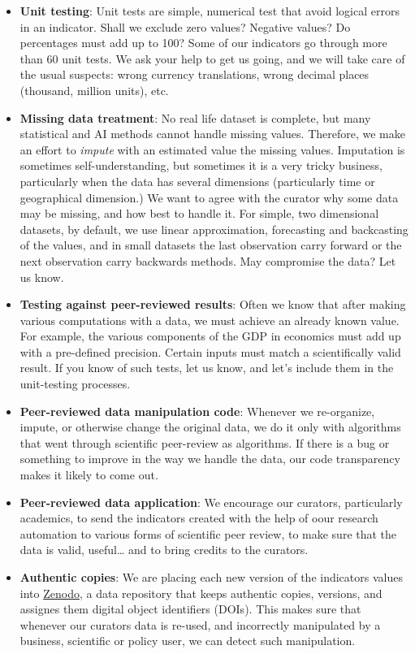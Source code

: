 \documentclass[
  a4paper,
  openany, a4paper, oneside]{book}
\begin{document}
\begin{itemize}
\item
  \textbf{Unit testing}: Unit tests are simple, numerical test that avoid logical errors in an indicator. Shall we exclude zero values? Negative values? Do percentages must add up to 100? Some of our indicators go through more than 60 unit tests. We ask your help to get us going, and we will take care of the usual suspects: wrong currency translations, wrong decimal places (thousand, million units), etc.
\item
  \textbf{Missing data treatment}: No real life dataset is complete, but many statistical and AI methods cannot handle missing values. Therefore, we make an effort to \emph{impute} with an estimated value the missing values. Imputation is sometimes self-understanding, but sometimes it is a very tricky business, particularly when the data has several dimensions (particularly time or geographical dimension.) We want to agree with the curator why some data may be missing, and how best to handle it. For simple, two dimensional datasets, by default, we use linear approximation, forecasting and backcasting of the values, and in small datasets the last observation carry forward or the next observation carry backwards methods. May compromise the data? Let us know.
\item
  \textbf{Testing against peer-reviewed results}: Often we know that after making various computations with a data, we must achieve an already known value. For example, the various components of the GDP in economics must add up with a pre-defined precision. Certain inputs must match a scientifically valid result. If you know of such tests, let us know, and let's include them in the unit-testing processes.
\item
  \textbf{Peer-reviewed data manipulation code}: Whenever we re-organize, impute, or otherwise change the original data, we do it only with algorithms that went through scientific peer-review as algorithms. If there is a bug or something to improve in the way we handle the data, our code transparency makes it likely to come out.
\item
  \textbf{Peer-reviewed data application}: We encourage our curators, particularly academics, to send the indicators created with the help of oour research automation to various forms of scientific peer review, to make sure that the data is valid, useful\ldots{} and to bring credits to the curators.
\item
  \textbf{Authentic copies}: We are placing each new version of the indicators values into \href{}{Zenodo}, a data repository that keeps authentic copies, versions, and assignes them digital object identifiers (DOIs). This makes sure that whenever our curators data is re-used, and incorrectly manipulated by a business, scientific or policy user, we can detect such manipulation.
\end{itemize}
\end{document}
